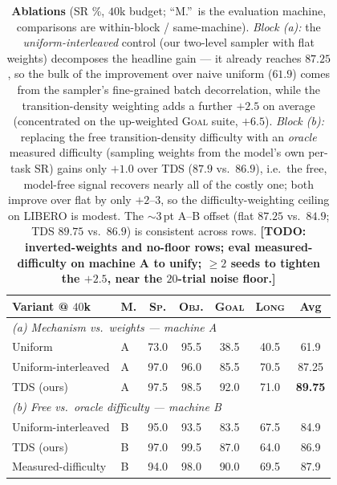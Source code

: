 \documentclass[letterpaper]{article} %
\newcommand{\tds}{TDS}
\begin{document}
\begin{table}[t]
\centering
\setlength{\tabcolsep}{1.2mm}
\begin{tabular}{llccccc}
\toprule
Variant @ $40$k & M. & \textsc{Sp.} & \textsc{Obj.} & \textsc{Goal} & \textsc{Long} & Avg \\
\midrule
\multicolumn{7}{l}{\emph{(a) Mechanism vs.\ weights --- machine A}}\\
Uniform & A & 73.0 & 95.5 & 38.5 & 40.5 & 61.9 \\
Uniform-interleaved & A & 97.0 & 96.0 & 85.5 & 70.5 & 87.25 \\
\tds{} (ours) & A & 97.5 & 98.5 & 92.0 & 71.0 & \textbf{89.75} \\
\midrule
\multicolumn{7}{l}{\emph{(b) Free vs.\ oracle difficulty --- machine B}}\\
Uniform-interleaved & B & 95.0 & 93.5 & 83.5 & 67.5 & 84.9 \\
\tds{} (ours) & B & 97.0 & 99.5 & 87.0 & 64.0 & 86.9 \\
Measured-difficulty & B & 94.0 & 98.0 & 90.0 & 69.5 & 87.9 \\
\bottomrule
\end{tabular}
\caption{\textbf{Ablations} (SR \%, $40$k budget; ``M.''\ is the evaluation machine, comparisons are within-block / same-machine). \emph{Block (a):} the \emph{uniform-interleaved} control (our two-level sampler with flat weights) decomposes the headline gain --- it already reaches $87.25$, so the bulk of the improvement over naive uniform ($61.9$) comes from the sampler's fine-grained batch decorrelation, while the transition-density weighting adds a further $+2.5$ on average (concentrated on the up-weighted \textsc{Goal} suite, $+6.5$). \emph{Block (b):} replacing the free transition-density difficulty with an \emph{oracle} measured difficulty (sampling weights from the model's own per-task SR) gains only $+1.0$ over \tds{} ($87.9$ vs.\ $86.9$), i.e.\ the free, model-free signal recovers nearly all of the costly one; both improve over flat by only $+2$--$3$, so the difficulty-weighting ceiling on LIBERO is modest. The $\sim\!3$\,pt A--B offset (flat $87.25$ vs.\ $84.9$; \tds{} $89.75$ vs.\ $86.9$) is consistent across rows. \textbf{[TODO: inverted-weights and no-floor rows; eval measured-difficulty on machine A to unify; $\ge 2$ seeds to tighten the $+2.5$, near the $20$-trial noise floor.]}}
\label{tab:ablation}
\end{table}
\end{document}
